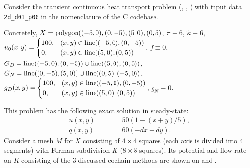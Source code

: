 \begin{example}
  \label{cmc/diffusion/continuous/transient/examples/2d_d01_p00-example}
  Consider the transient continuous heat transport problem
  (,
   ,
   )
  with input data \verb|2d_d01_p00| in the nomenclature of the C codebase.

  Concretely,
    $X = {\rm polygon}((-5, 0), (0, -5), (5, 0), (0, 5)$,
    $\tilde{\pi} \equiv 6$,
    $\tilde{\kappa} \equiv 6$,
    \newline
    $u_0(x, y) =
      \begin{cases}
        100, & (x, y) \in {\rm line}((-5, 0), (0, -5)) \\
        0, & (x, y) \in {\rm line}((5, 0), (0, 5))
      \end{cases}$,
    $f \equiv 0$,
    \newline
    $G_D = {\rm line}((-5, 0), (0, -5)) \cup {\rm line}((5, 0), (0, 5))$,
    $G_N = {\rm line}((0, -5), (5, 0)) \cup {\rm line}((0, 5), (-5, 0))$,
    \newline
    $g_D(x, y) =
      \begin{cases}
        100, & (x, y) \in {\rm line}((-5, 0), (0, -5)) \\
        0, & (x, y) \in {\rm line}((5, 0), (0, 5))
      \end{cases}$,
    $g_N \equiv 0$.

  This problem has the following exact solution in steady-state:
  \begin{subequations}
    \begin{alignat}{3}
      & u(x, y) && = && 50 (1 - (x + y) / 5), \\
      & q(x, y) && = && 60 (- d x + d y).
    \end{alignat}
  \end{subequations}
  Consider a mesh $M$ for $X$ consisting of $4 \times 4$ squares (each axis is
  divided into $4$ segments) with Forman subdivision $K$ ($8 \times 8$ squares).
  Its potential and flow rate on $K$ consisting of the $3$ discussed cochain
  methods are shown on
  and
  .
\end{example}

